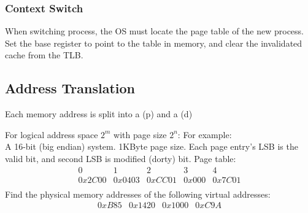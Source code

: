 \documentclass{report}
\begin{document}
\subsubsection*{Context Switch}
When switching process, the OS must locate the page table of the new process. Set the base register to point to the table in memory, and clear the invalidated cache from the TLB.

\subsection*{Address Translation}
Each memory address is split into a (p) and a (d)
\begin{itemize}
\end{itemize}
For logical address space $2^m$ with page size $2^n$:
For example:
\\ A 16-bit (big endian) system. 1KByte page size. Each page entry's LSB is the valid bit, and second LSB is modified (dorty) bit.
Page table:
\[\begin{matrix}
		0      & 1      & 2      & 3     & 4      \\
		0x2C00 & 0x0403 & 0xCC01 & 0x000 & 0x7C01 \\
	\end{matrix}\]
Find the physical memory addresses of the following virtual addresses:
\[\begin{matrix}
		0xB85 & 0x1420 & 0x1000 & 0xC9A \\
	\end{matrix}\]
\end{document}
